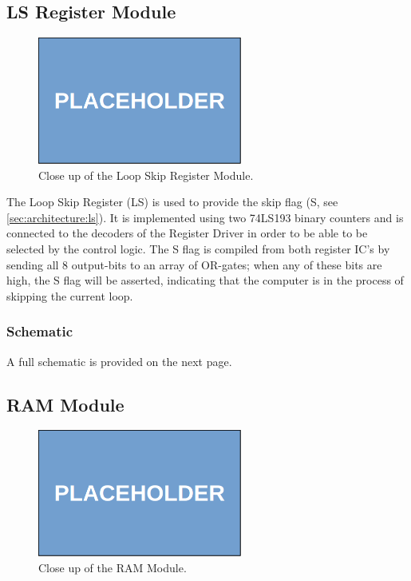 
\subsection{LS Register Module}
\begin{figure}[H]
  \centering
  \includegraphics[width=0.6\textwidth]{img/placeholder}
  \caption{Close up of the Loop Skip Register Module.}
  \label{fig:spregcloseup}
\end{figure}

The Loop Skip Register (LS) is used to provide the skip flag (S, see \ref{sec:architecture:ls}). It is implemented using two 74LS193 binary counters and is connected to the decoders of the Register Driver in order to be able to be selected by the control logic. The S flag is compiled from both register IC's by sending all 8 output-bits to an array of OR-gates; when any of these bits are high, the S flag will be asserted, indicating that the computer is in the process of skipping the current loop.


\subsubsection{Schematic}
A full schematic is provided on the next page.





\subsection{RAM Module}
\begin{figure}[H]
  \centering
  \includegraphics[width=0.6\textwidth]{img/placeholder}
  \caption{Close up of the RAM Module.}
  \label{fig:ramcloseup}
\end{figure}

